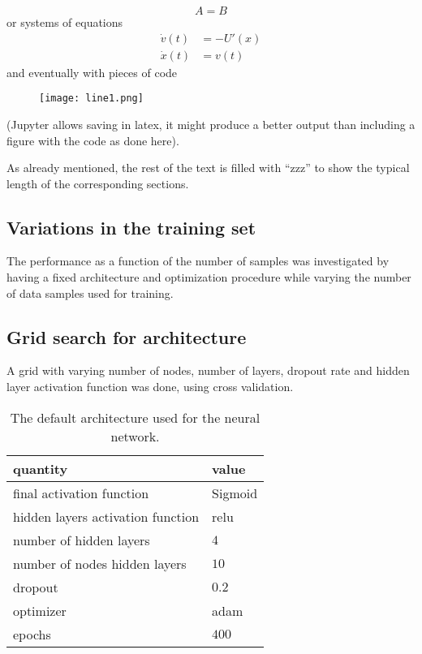 \documentclass[prl,twocolumn]{revtex4-1}
\begin{document}



\begin{equation}
  A=B
  \label{eq:simple}
\end{equation}
or systems of equations
\begin{align}
  \dot v(t) & =  -U'(x)\nonumber \\
  \dot x(t) & =  v(t)
  \label{eq:motion}
\end{align}
and  eventually with  pieces of code
\begin{figure}[h]
  \texttt{[image: line1.png]}
\end{figure}
(Jupyter allows saving in latex, it might produce a better output than including a figure with the code as done here).

  As already mentioned, the rest of the text is filled with ``zzz'' to show the typical length of the corresponding sections.

\subsection{Variations in the training set}
The performance as a function of the number of samples was investigated by having a fixed architecture and optimization procedure while varying the number of data samples used for training. 

\subsection{Grid search for architecture}
A grid with varying number of nodes, number of layers, dropout rate and hidden layer activation function was done, using cross validation.  


\begin{table}[!b]
\begin{center}
\begin{tabular}{ll}
quantity & value \\
\hline
final activation function & Sigmoid \\
hidden layers activation function & relu\\
number of hidden layers & $4$ \\
number of nodes hidden layers & $10$\\
dropout & $0.2$\\
optimizer & adam\\
epochs & $400$ \\

\end{tabular}
\end{center}
\caption{The default architecture used for the neural network.}
\label{tab:1}
\end{table}
\end{document}
